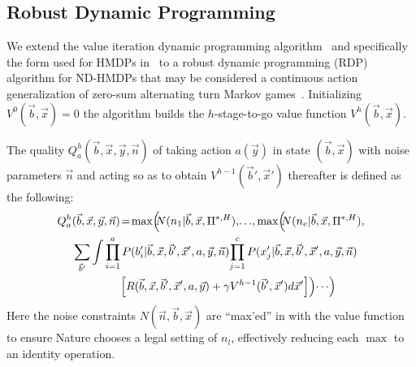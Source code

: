 \documentclass[letterpaper]{article}
\begin{document}
 
\subsection{Robust Dynamic Programming}

We extend the value iteration dynamic programming
algorithm~\cite{bellman} and specifically the form used for HMDPs
in~\cite{sdp_aaai} to a robust dynamic programming (RDP) algorithm for
ND-HMDPs that may be considered a continuous action generalization of
zero-sum alternating turn Markov games~\cite{littman94}.  Initializing
$V^0(\vec{b},\vec{x}) = 0$ the algorithm builds the $h$-stage-to-go
value function $V^h(\vec{b},\vec{x})$.

The quality $Q_a^{h}(\vec{b},\vec{x},\vec{y},\vec{n})$ of taking
action $a(\vec{y})$ in state $(\vec{b},\vec{x})$ with noise parameters
$\vec{n}$ and acting so as to obtain $V^{h-1}(\vec{b}',\vec{x}')$ thereafter 
is defined as the following:
{\footnotesize
\begin{align}
Q_a^{h}&(\vec{b},\vec{x},\vec{y},\vec{n}) \! = \!
\max\!\Big(\!\!N(n_1|\vec{b},\vec{x},\Pi^{*,H}),\!\ldots\!, \max\!\Big(\!\!N(n_e|\vec{b},\vec{x},\Pi^{*,H}), \nonumber \\
& 
\sum_{\vec{b}'} \int \prod_{i=1}^a P(b_i'|\vec{b},\vec{x},\vec{b}',\vec{x}',a,\vec{y},\vec{n}) \!
\prod_{j=1}^c P(x_j'|\vec{b},\vec{x},\vec{b}',\vec{x}',a,\vec{y},\vec{n}) \! \nonumber \\
& \qquad \qquad \; \Big[ R(\vec{b},\vec{x},\vec{b}',\vec{x}',a,\vec{y}) + \gamma V^{h-1}(\vec{b}',\vec{x}') d\vec{x}' \Big] \Big) \! \cdots \! \Big) \hspace{-2mm} \label{eq:qfun}
\end{align}}
Here the noise constraints $N(\vec{n},\vec{b},\vec{x})$ are ``max'ed''
in with the value function to ensure Nature chooses a legal setting 
of $n_l$, effectively reducing each $\max$ to an identity operation.  
\end{document}
